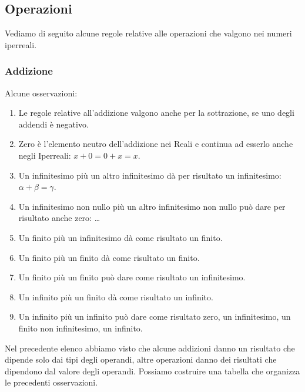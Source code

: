 \vspace{-5mm}

\subsection{Operazioni}
\label{subsec:insnum_operazioni}

Vediamo di seguito alcune regole relative alle operazioni 
che valgono nei numeri iperreali.

\subsubsection{Addizione}
\label{subsec:insnum_addizione}

\begin{multicols}{2}
Alcune osservazioni:

\begin{enumerate} [noitemsep]
 \item Le regole relative all'addizione valgono anche per la sottrazione, 
se uno degli addendi è negativo. 
 \item Zero è l'elemento neutro dell'addizione nei Reali e continua ad 
esserlo anche negli Iperreali: \(x+0=0+x=x\).
 \item Un infinitesimo più un altro infinitesimo dà per risultato un 
infinitesimo: \(\alpha+\beta=\gamma\).
 \item Un infinitesimo non nullo più un altro infinitesimo non nullo può 
dare per risultato anche zero: \dots
 \item Un finito più un infinitesimo dà come risultato un finito.
 \item Un finito più un finito dà come risultato un finito.
 \item Un finito più un finito può dare come risultato un infinitesimo.
 \item Un infinito più un finito dà come risultato un infinito.
 \item Un infinito più un infinito può dare come risultato zero, un 
infinitesimo, un finito non infinitesimo, un infinito.
\end{enumerate}

Nel precedente elenco abbiamo visto che alcune addizioni danno un risultato 
che dipende solo dai tipi degli operandi, altre operazioni danno dei 
risultati 
che dipendono dal valore degli operandi. Possiamo costruire una tabella che 
organizza le precedenti osservazioni.


\end{multicols}
